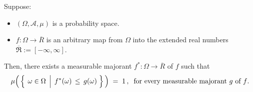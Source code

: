 \begin{lemma}
\mbox{}\vskip 0.1cm
\noindent
Suppose:
\begin{itemize}
\item
	$(\Omega,\mathcal{A},\mu)$ is a probability space.
\item
	$f : \Omega \longrightarrow \overline{R}$
	is an arbitrary map from $\Omega$ into the extended real numbers
	$\overline{\Re} := [-\infty,\infty]$.
\end{itemize}
Then, there exists a measurable majorant $f^{*} : \Omega \longrightarrow \overline{R}$ of $f$ such that
\begin{equation*}
\mu\!\left(\,\left\{\;\left.\omega\overset{{\color{white}.}}{\in}\Omega\;\,\right\vert\; f^{*}(\omega) \,\leq\, g(\omega)\;\right\}\,\right)
\;=\;1\,,\;\;
\textnormal{for every measurable majorant $g$ of $f$}.
\end{equation*}
\end{lemma}

